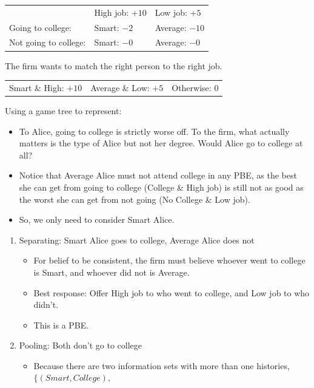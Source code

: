 \documentclass[notitlepage]{article}
\begin{document}
\begin{itemize}
    \begin{center}
    \renewcommand{\arraystretch}{1.5}
    \begin{tabular}{lll}
    & High job: $+10$ & Low job: $+5$ \\
    Going to college:     & Smart: $-2$ & Average: $-10$ \\
    Not going to college: & Smart: $-0$ & Average: $-0$  \\
    \end{tabular}
    \end{center}

    The firm wants to match the right person to the right job.

    \begin{center}
    \renewcommand{\arraystretch}{1.5}
    \begin{tabular}{lll}
    Smart \& High: $+10$ & Average \& Low: $+5$ & Otherwise: $0$ \\
    \end{tabular}
    \end{center}

    \newpage
    Using a game tree to represent:
    \begin{figure}[h]
        \centering
        \resizebox{0.4\textwidth}{!}{
        
        }
    \end{figure}
    \begin{itemize}
        \item To Alice, going to college is strictly worse off. To the firm, what actually matters is the type of Alice but not her degree. Would Alice go to college at all?
        \item Notice that Average Alice must not attend college in any PBE, as the best she can get from going to college (College \& High job) is still not as good as the worst she can get from not going (No College \& Low job).
        \item So, we only need to consider Smart Alice.
    \end{itemize}
    \begin{enumerate}
        \item Separating: Smart Alice goes to college, Average Alice does not
        \begin{itemize}
            \item For belief to be consistent, the firm must believe whoever went to college is Smart, and whoever did not is Average.
            \item Best response: Offer High job to who went to college, and Low job to who didn't.
            \item This is a PBE.
        \end{itemize}
        \item Pooling: Both don't go to college
        \begin{itemize}
            \item Because there are two information sets with more than one histories, \(\{(Smart, College), \)
            

\end{itemize}
\end{enumerate}
\end{itemize}
\end{document}
